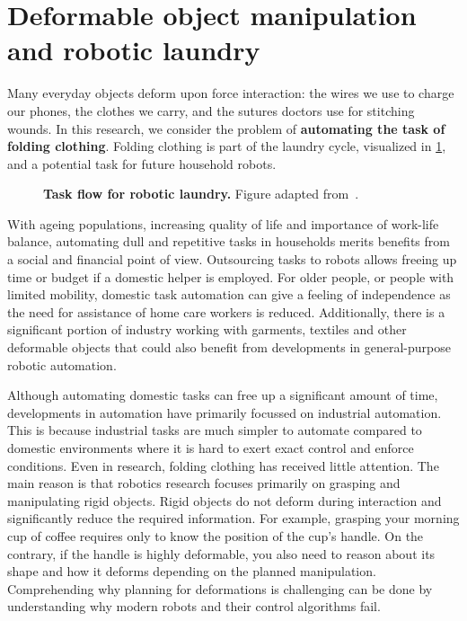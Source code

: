 \documentclass[\home/main.tex]{subfiles}
\begin{document}

\section{Deformable object manipulation and robotic laundry}
Many everyday objects deform upon force interaction: the wires we use to charge our phones, the clothes we carry, and the sutures doctors use for stitching wounds.
In this research, we consider the problem of \textbf{automating the task of folding clothing}. Folding clothing is part of the laundry cycle, visualized in \cref{fig:intro_laundry_cycle}, and a potential task for future household robots.
\begin{figure}[htbp]
    \centering
    
    \caption[Task flow for robotic laundry.]{\textbf{Task flow for robotic laundry.} Figure adapted from~\autocite{Hamajima1996}.}
    \label{fig:intro_laundry_cycle}
\end{figure}
With ageing populations, increasing quality of life and importance of work-life balance, automating dull and repetitive tasks in households merits benefits from a social and financial point of view. Outsourcing tasks to robots allows freeing up time or budget if a domestic helper is employed. For older people, or people with limited mobility, domestic task automation can give a feeling of independence as the need for assistance of home care workers is reduced.
Additionally, there is a significant portion of industry working with garments, textiles and other deformable objects that could also benefit from developments in general-purpose robotic automation.

Although automating domestic tasks can free up a significant amount of time, developments in automation have primarily focussed on industrial automation. This is because industrial tasks are much simpler to automate compared to domestic environments where it is hard to exert exact control and enforce conditions. Even in research, folding clothing has received little attention. The main reason is that robotics research focuses primarily on grasping and manipulating rigid objects. Rigid objects do not deform during interaction and significantly reduce the required information. For example, grasping your morning cup of coffee requires only to know the position of the cup's handle.
On the contrary, if the handle is highly deformable, you also need to reason about its shape and how it deforms depending on the planned manipulation.
Comprehending why planning for deformations is challenging can be done by understanding why modern robots and their control algorithms fail.
\end{document}
